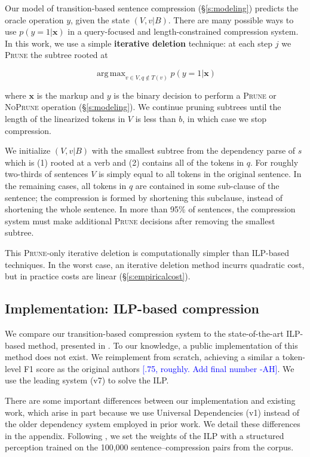 \documentclass[11pt,a4paper]{article}
\newcommand{\ahcomment}[1]{\textcolor{blue}{[#1 -AH]}}
\DeclareMathOperator*{\argmaxA}{arg\,max} %
\begin{document}
Our model of transition-based sentence compression (\S\ref{s:modeling}) predicts the oracle operation $y$, given the state $(V,v|B)$. There are many possible ways to use $p(y=1| \bm{x})$ in a query-focused and length-constrained compression system. In this work, we use a simple \textbf{iterative deletion} technique: at each step $j$ we \textsc{Prune} the subtree rooted at 

$$\argmaxA_{v \in V,q\not\in T(v)}   p(y = 1 | \bm{x})$$

\noindent where $\bm{x}$ is the markup and $y$ is the binary decision to perform a \textsc{Prune} or \textsc{NoPrune} operation (\S\ref{s:modeling}). We continue pruning subtrees until the length of the linearized tokens in $V$ is less than $b$, in which case we stop compression. 

We initialize $(V, v|B)$ with the smallest subtree from the dependency parse of $s$ which is (1) rooted at a verb and (2) contains all of the tokens in $q$. For roughly two-thirds of sentences $V$ is simply equal to all tokens in the original sentence. In the remaining cases, all tokens in $q$ are contained in some sub-clause of the sentence; the compression is formed by shortening this subclause, instead of shortening the whole sentence. In more than 95\% of sentences, the compression system must make additional \textsc{Prune} decisions after removing the smallest subtree.

This \textsc{Prune}-only iterative deletion is computationally simpler than ILP-based techniques. In the worst case, an iterative deletion method incurrs quadratic cost, but in practice costs are linear (\S\ref{s:empiricalcost}).

\subsection{Implementation: ILP-based compression}\label{s:ilp}

We compare our transition-based compression system to the state-of-the-art ILP-based method, presented in \citet{filippova2013overcoming}. To our knowledge, a public implementation of this method does not exist. We reimplement from scratch, achieving a similar a token-level F1 score as the original authors \ahcomment{.75, roughly. Add final number}. We use the leading \citet{gurobi} system (v7) to solve the ILP.

There are some important differences between our implementation and existing work, which arise in part because we use Universal Dependencies (v1) instead of the older dependency system employed in prior work. We detail these differences in the appendix. Following \citet{filippova2013overcoming}, we set the weights of the ILP with a structured perception trained on the 100,000 sentence--compression pairs from the corpus.
\end{document}
